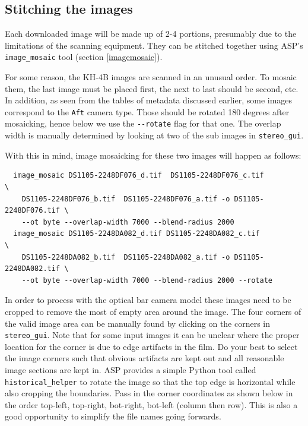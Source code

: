 \subsection{Stitching the images}

Each downloaded image will be made up of 2-4 portions, presumably due
to the limitations of the scanning equipment. They can be stitched together
using ASP's \texttt{image\_mosaic} tool (section \ref{imagemosaic}).

For some reason, the KH-4B images are scanned in an unusual order. To
mosaic them, the last image must be placed first, the next to last
should be second, etc. In addition, as seen from the tables of metadata discussed
earlier, some images correspond to the \texttt{Aft} camera type. Those
should be rotated 180 degrees after mosaicking, hence below we use
the \texttt{-\/-rotate} flag for that one.  The overlap width is manually 
determined by looking at two of the sub images in \texttt{stereo\_gui}.

With this in mind, image mosaicking for these two images will happen as follows:

\begin{verbatim}
  image_mosaic DS1105-2248DF076_d.tif  DS1105-2248DF076_c.tif              \
    DS1105-2248DF076_b.tif  DS1105-2248DF076_a.tif -o DS1105-2248DF076.tif \
    --ot byte --overlap-width 7000 --blend-radius 2000
  image_mosaic DS1105-2248DA082_d.tif DS1105-2248DA082_c.tif               \
    DS1105-2248DA082_b.tif  DS1105-2248DA082_a.tif -o DS1105-2248DA082.tif \
    --ot byte --overlap-width 7000 --blend-radius 2000 --rotate
\end{verbatim}

In order to process with the optical bar camera model these images need to be cropped
to remove the most of empty area around the image.  The four corners of the valid image 
area can be manually found by clicking on the corners in \texttt{stereo\_gui}.  Note that
for some input images it can be unclear where the proper location for the corner is due to
edge artifacts in the film.  Do your best to select the image corners such that obvious
artifacts are kept out and all reasonable image sections are kept in.
ASP provides a simple Python tool called \texttt{historical\_helper} to rotate the image so that the top edge is horizontal
while also cropping the boundaries.  Pass in the corner coordinates as shown below
in the order top-left, top-right, bot-right, bot-left (column then row).
This is also a good opportunity to simplify the file names going forwards.


